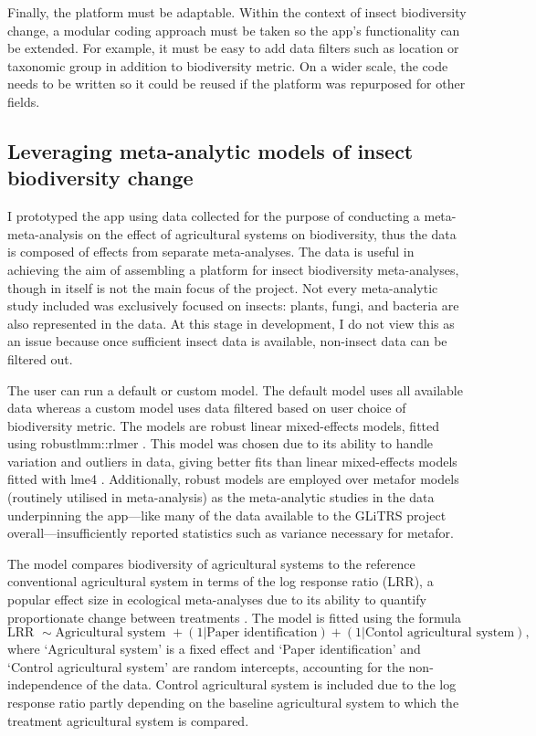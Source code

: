 \documentclass[11pt]{article}
\begin{document}
		\noindent Finally, the platform must be adaptable. Within the context of insect biodiversity change, a modular coding approach must be taken so the app’s functionality can be extended. For example, it must be easy to add data filters such as location or taxonomic group in addition to biodiversity metric. On a wider scale, the code needs to be written so it could be reused if the platform was repurposed for other fields.   
		
		\subsection{Leveraging meta-analytic models of insect biodiversity change}     
		I prototyped the app using data collected for the purpose of conducting a meta-meta-analysis on the effect of agricultural systems on biodiversity, thus the data is composed of effects from separate meta-analyses. The data is useful in achieving the aim of assembling a platform for insect biodiversity meta-analyses, though in itself is not the main focus of the project. Not every meta-analytic study included was exclusively focused on insects: plants, fungi, and bacteria are also represented in the data. At this stage in development, I do not view this as an issue because once sufficient insect data is available, non-insect data can be filtered out.
		
		\noindent The user can run a default or custom model. The default model uses all available data whereas a custom model uses data filtered based on user choice of biodiversity metric. The models are robust linear mixed-effects models, fitted using robustlmm::rlmer \citep{koller2016robustlmm}. This model was chosen due to its ability to handle variation and outliers in data, giving better fits than linear mixed-effects models fitted with lme4 \citep{bates2014fitting}. Additionally, robust models are employed over metafor models \citep{viechtbauer2010conducting} (routinely utilised in meta-analysis) as the meta-analytic studies in the data underpinning the app—like many of the data available to the GLiTRS project overall—insufficiently reported statistics such as variance necessary for metafor.
		
		\noindent The model compares biodiversity of agricultural systems to the reference conventional agricultural system in terms of the log response ratio (LRR), a popular effect size in ecological meta-analyses due to its ability to quantify proportionate change between treatments \citep{hedges1999meta}. The model is fitted using the formula
		\begin{equation}
		\mbox{LRR } \sim \mbox{Agricultural system } + (1|\mbox{Paper identification}) + (1|\mbox{Contol agricultural system}),
		\end{equation}
		\noindent where ‘Agricultural system’ is a fixed effect and ‘Paper identification’ and ‘Control agricultural system’ are random intercepts, accounting for the non-independence of the data. Control agricultural system is included due to the log response ratio partly depending on the baseline agricultural system to which the treatment agricultural system is compared. 
		
\end{document}
